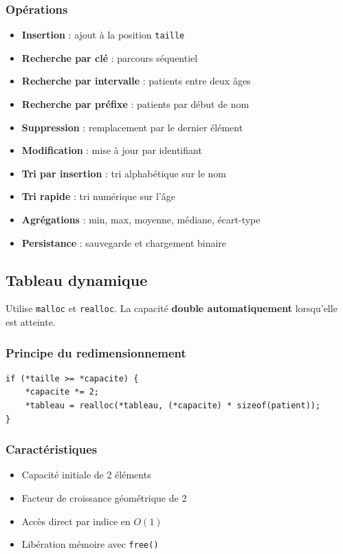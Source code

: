 \documentclass[12pt, a4paper]{article}
\begin{document}
\subsubsection{Opérations}
\begin{itemize}[leftmargin=2em, itemsep=3pt]
    \item \textbf{Insertion} : ajout à la position \texttt{taille}
    \item \textbf{Recherche par clé} : parcours séquentiel
    \item \textbf{Recherche par intervalle} : patients entre deux âges
    \item \textbf{Recherche par préfixe} : patients par début de nom
    \item \textbf{Suppression} : remplacement par le dernier élément
    \item \textbf{Modification} : mise à jour par identifiant
    \item \textbf{Tri par insertion} : tri alphabétique sur le nom
    \item \textbf{Tri rapide} : tri numérique sur l'âge
    \item \textbf{Agrégations} : min, max, moyenne, médiane, écart-type
    \item \textbf{Persistance} : sauvegarde et chargement binaire
\end{itemize}

\subsection{Tableau dynamique}
Utilise \texttt{malloc} et \texttt{realloc}. La capacité 
\textbf{double automatiquement} lorsqu'elle est atteinte.

\subsubsection{Principe du redimensionnement}
\begin{verbatim}
if (*taille >= *capacite) {
    *capacite *= 2;
    *tableau = realloc(*tableau, (*capacite) * sizeof(patient));
}
\end{verbatim}

\subsubsection{Caractéristiques}
\begin{itemize}[leftmargin=2em, itemsep=3pt]
    \item Capacité initiale de 2 éléments
    \item Facteur de croissance géométrique de 2
    \item Accès direct par indice en $O(1)$
    \item Libération mémoire avec \texttt{free()}
\end{itemize}
\end{document}
